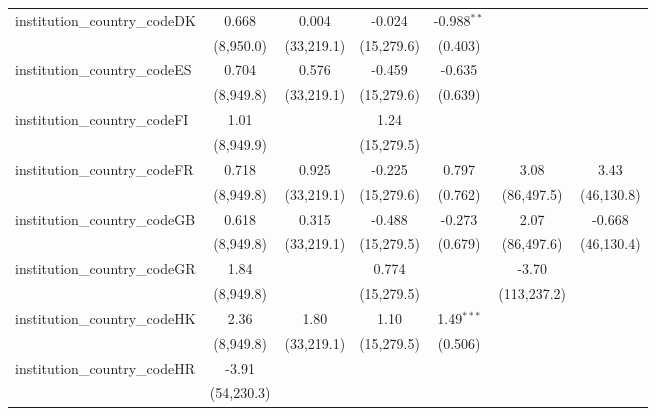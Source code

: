 \begin{tabular}{lcccccc}
   institution\_country\_codeDK          & 0.668         & 0.004         & -0.024        & -0.988$^{**}$ &              &   \\   
                                         & (8,950.0)     & (33,219.1)    & (15,279.6)    & (0.403)       &              &   \\   
   institution\_country\_codeES          & 0.704         & 0.576         & -0.459        & -0.635        &              &   \\   
                                         & (8,949.8)     & (33,219.1)    & (15,279.6)    & (0.639)       &              &   \\   
   institution\_country\_codeFI          & 1.01          &               & 1.24          &               &              &   \\   
                                         & (8,949.9)     &               & (15,279.5)    &               &              &   \\   
   institution\_country\_codeFR          & 0.718         & 0.925         & -0.225        & 0.797         & 3.08         & 3.43\\   
                                         & (8,949.8)     & (33,219.1)    & (15,279.6)    & (0.762)       & (86,497.5)   & (46,130.8)\\   
   institution\_country\_codeGB          & 0.618         & 0.315         & -0.488        & -0.273        & 2.07         & -0.668\\   
                                         & (8,949.8)     & (33,219.1)    & (15,279.5)    & (0.679)       & (86,497.6)   & (46,130.4)\\   
   institution\_country\_codeGR          & 1.84          &               & 0.774         &               & -3.70        &   \\   
                                         & (8,949.8)     &               & (15,279.5)    &               & (113,237.2)  &   \\   
   institution\_country\_codeHK          & 2.36          & 1.80          & 1.10          & 1.49$^{***}$  &              &   \\   
                                         & (8,949.8)     & (33,219.1)    & (15,279.5)    & (0.506)       &              &   \\   
   institution\_country\_codeHR          & -3.91         &               &               &               &              &   \\   
                                         & (54,230.3)    &               &               &               &              &   \\   

\end{tabular}
